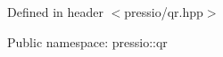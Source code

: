 

Defined in header {\ttfamily $<$pressio/qr.\+hpp$>$}

Public namespace\+: {\ttfamily pressio\+::qr} 